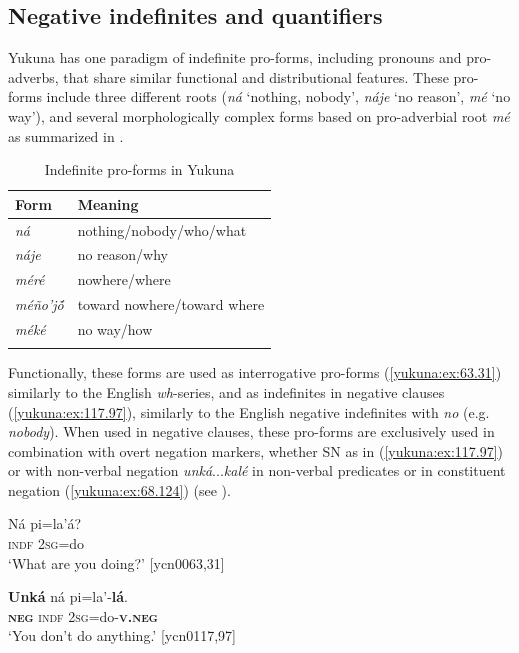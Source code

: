 \documentclass[output=paper,colorlinks,citecolor=brown]{langscibook}
\begin{document}
 
\subsection{Negative indefinites and quantifiers}\label{yukuna:INDF}

Yukuna has one paradigm of indefinite pro-forms, including pronouns and pro-adverbs, that share similar functional and distributional features. These pro-forms include three different roots (\textit{ná} `nothing, nobody', \textit{náje} `no reason', \textit{mé} `no way'), and several morphologically complex forms based on pro-adverbial root \textit{mé} as summarized in .

\begin{table} 	
\caption{Indefinite pro-forms in Yukuna}				
\label{yukuna:tableINDF}				
 \begin{tabular}{ll}
\lsptoprule
Form				& Meaning \\
\midrule
\textit{ná 	}	&	nothing/nobody/who/what \\
\textit{náje 	}	&	no reason/why \\
\textit{méré	}	&	nowhere/where \\
\textit{méño'jṍ 	}	&	toward nowhere/toward where \\
\textit{méké 	}	&	no way/how \\
 \lspbottomrule				
 \end{tabular}				
\end{table}		

Functionally, these forms are used as interrogative pro-forms (\ref{yukuna:ex:63.31}) similarly to the English \textit{wh}-series, and as indefinites in negative clauses (\ref{yukuna:ex:117.97}), similarly to the English negative {indefinites} with \textit{no} (e.g. \textit{nobody}). When used in negative clauses, these pro-forms are exclusively used in combination with overt negation markers, whether SN as in (\ref{yukuna:ex:117.97}) or with non-verbal negation \textit{unká}{...}\textit{kalé} in non-verbal predicates or in constituent negation (\ref{yukuna:ex:68.124}) (see ).

\ea\label{yukuna:ex:63.31}
\gll Ná pi=la'á?   \\
\textsc{indf} \textsc{2sg}=do \\
\glt ‘What are you doing?’ [ycn0063,31]
\z

\ea\label{yukuna:ex:117.97}
\gll \textbf{Unká} ná pi=la'-\textbf{lá}.  \\
\textbf{\textsc{neg}} \textsc{indf} \textsc{2sg}=do-\textbf{\textsc{v.neg}} \\
\glt ‘You don't do anything.’ [ycn0117,97]
\z
\end{document}
